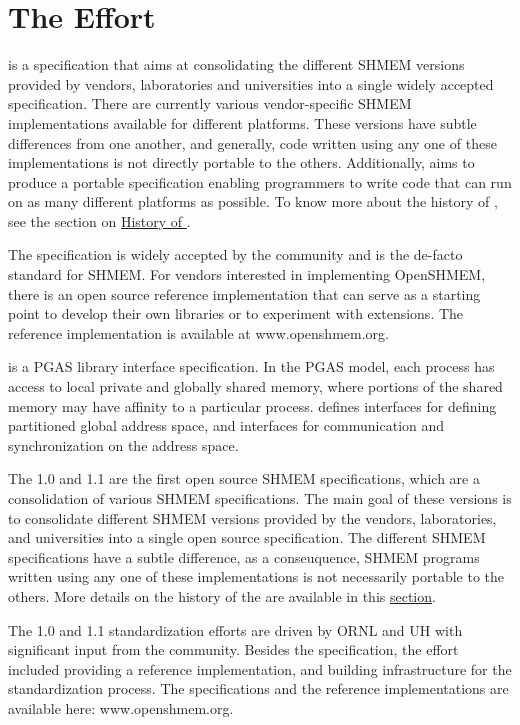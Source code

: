 
\section{The \openshmem Effort}

\openshmem is a specification that aims at consolidating the different
SHMEM versions provided by vendors, laboratories and universities 
into a single widely accepted specification. There are currently various vendor-specific SHMEM implementations available for
different platforms. These versions have subtle differences from one
another, and generally, code written using any one of these
implementations is not directly portable to the others. Additionally, \openshmem aims
to produce a portable specification enabling programmers to write
\openshmem code that can run on as many different platforms
as possible. To know more about the history of \openshmem, see the section on \hyperref[sec:openshmem_history]{History of \openshmem}.

The \openshmem specification is widely accepted by the community and is the de-facto
standard for SHMEM.  For vendors interested in implementing OpenSHMEM, there is an open source reference implementation
that can serve as a starting point to develop their own libraries or to experiment with extensions. The reference implementation is available at www.openshmem.org.


\openshmem is a \ac{PGAS} library interface specification. In the \ac{PGAS} model, each process has access to 
local private and globally shared memory, where portions of the shared memory may have affinity to a particular process. \openshmem
defines interfaces for defining partitioned global address space, and
interfaces for communication and synchronization on the address space. 


The \openshmem{} 1.0 and 1.1 are the first open source SHMEM specifications,
which are a consolidation of various SHMEM specifications. 
The main goal of these versions is to consolidate different SHMEM versions
provided by the vendors, laboratories, and universities into a single open
source specification. The different SHMEM specifications have a subtle
difference, as a conseuquence, SHMEM programs written using any one of these 
implementations is not necessarily portable to the others. 
More details on the history of the \openshmem are available in this
\hyperref[sec:openshmem_history]{section}.

The \openshmem{} 1.0 and 1.1 standardization efforts are driven by \ac{ORNL} and \ac{UH} 
with significant input from the \openshmem{} community. Besides the
specification, the effort included providing a reference implementation,
 and building infrastructure for the standardization process.
The specifications and the reference implementations are available here: 
www.openshmem.org.

